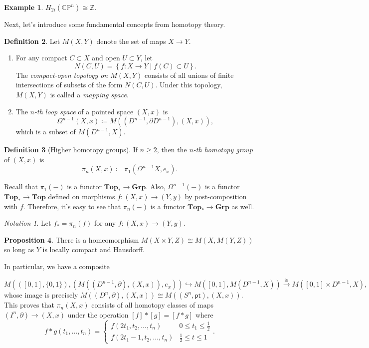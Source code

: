 \documentclass[10pt,letterpaper,cm]{nupset}
\theoremstyle{definition}
\newtheorem{defn}{Definition}[subsection]
\newtheorem{exmp}[defn]{Example}
\theoremstyle{theorem}
\newtheorem{prop}[defn]{Proposition}
\theoremstyle{remark}
\newtheorem*{notation}{Notation}
\newcommand{\CP}{\mathbb{CP}}
\newcommand{\Z}{\mathbb Z}
\newcommand{\1}{\mathbb{1}}
\newcommand{\0}{\vec 0}
\newcommand{\pt}{\mathsf{pt}}
\newcommand{\be}{\begin{enumerate}}
\newcommand{\ee}{\end{enumerate}}
\begin{document}
\smallskip

\begin{exmp}
$H_{2i}(\CP^n) \cong \Z$.
\end{exmp}

\bigskip

Next, let's introduce some fundamental concepts from homotopy theory. 

\begin{defn} Let $M(X, Y)$ denote the set of maps $X \to Y$. 
\be
\item For any compact $C \subset X$ and open $U \subset Y$, let $$N(C, U) = \left\{f : X \to Y \mid f(C) \subset U \right\}  .$$ The \textit{compact-open topology on $M(X, Y)$} consists of all unions of finite intersections of subsets of the form $N(C, U)$. Under this topology, $M(X,Y)$ is called a \textit{mapping space}. 
\item The \textit{$n$-th loop space} of a pointed space $\left(X, x\right)$ is $$\Omega^{n-1}(X, x) \coloneqq M((D^{n-1}, \partial{D^{n-1}}), (X, x)),$$  which is a subset of $M(D^{n-1}, X)$.
\ee 
\end{defn}


\begin{defn}[Higher homotopy groups]
If $n \geq 2$, then the \textit{$n$-th homotopy group} of $\left(X, x\right)$ is $$\pi_n(X,x) \coloneqq \pi_1(\Omega^{n-1}{X}, e_x).$$
\end{defn}

Recall that $\pi_1({-})$ is a functor $\mathbf{Top}_{\ast} \to \mathbf{Grp}$. Also, $\Omega^{n-1}({-})$ is a functor $\mathbf{Top}_{\ast}  \to \mathbf{Top} $ defined on morphisms $f: (X, x) \to (Y, y)$ by post-composition with $f$.
 Therefore, it's easy to see that $\pi_n({-})$ is a functor $\mathbf{Top}_{\ast} \to \mathbf{Grp}$ as well.

\begin{notation} 
Let $f_{\ast} =  \pi_n(f)$ for any $f: (X, x) \to (Y, y)$.
\end{notation}

\begin{prop}
There is a homeomorphism $M(X \times Y, Z) \cong M(X, M(Y, Z))$ so long as $Y$ is locally compact and Hausdorff. 
\end{prop}

In particular, we have a composite 

\[
M(([0,1], \{0,1\}), (M((D^{n-1}, \partial), (X,x)), e_x)) \hookrightarrow M([0,1], M(D^{n-1}, X)) \overset{\cong}{\longrightarrow} M([0,1] \times D^{n-1}, X),
\] whose image is precisely $M((D^n, \partial), (X,x)) \cong M((S^n, \pt), (X,x))$. This proves that $\pi_n(X,x)$ consists of all homotopy classes of maps $\left(I^n, \partial\right) \to \left(X,x\right)$ under the operation $\left[f\right] \ast \left[g\right] = \left[f \ast g\right]$ where $$ f \ast g(t_1, \ldots, t_n) = \begin{cases}
      f(2t_1, t_2, \ldots, t_n) & 0\leq t_1 \leq \frac{1}{2}
      \\ f(2t_1-1, t_2, \ldots, t_n) & \frac{1}{2} \leq t\leq 1
\end{cases}    .$$ 
\end{document}

